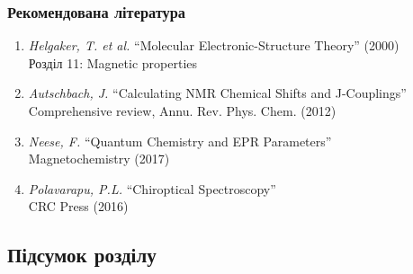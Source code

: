 \subsubsection{Рекомендована література}

\begin{enumerate}
    \item \textit{Helgaker, T. et al.} ``Molecular Electronic-Structure Theory'' (2000) \\
    Розділ 11: Magnetic properties

    \item \textit{Autschbach, J.} ``Calculating NMR Chemical Shifts and J-Couplings'' \\
    Comprehensive review, Annu. Rev. Phys. Chem. (2012)

    \item \textit{Neese, F.} ``Quantum Chemistry and EPR Parameters'' \\
    Magnetochemistry (2017)

    \item \textit{Polavarapu, P.L.} ``Chiroptical Spectroscopy'' \\
    CRC Press (2016)
\end{enumerate}

\subsection{Підсумок розділу}

